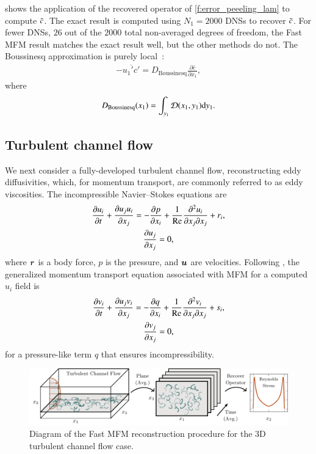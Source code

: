 \documentclass[11pt,sort&compress]{elsarticle}
\begin{document}
 shows the application of the recovered operator of \cref{f:error_peeeling_lam} to compute $\bar{c}$. 
The exact result is computed using $N_1 = 2000$ DNSs to recover $\bar{c}$.
For fewer DNSs, $26$ out of the $2000$ total non-averaged degrees of freedom, the Fast MFM result matches the exact result well, but the other methods do not. 
The Boussinesq approximation is purely local~\citep{hamba2004nonlocal}:
\begin{gather}
    -\overline{u_1'c'} = D_{\mathrm{Boussinesq}}\frac{\partial \bar{c}}{\partial x_1},
\end{gather}
where
\begin{gather}
    D_{\mathrm{Boussinesq}}(x_1) = 
    \int_{y_1} \mathcal{D}(x_1,y_1) \text{d} y_1.
\end{gather}

\subsection{Turbulent channel flow}

We next consider a fully-developed turbulent channel flow, reconstructing eddy diffusivities, which, for momentum transport, are commonly referred to as eddy viscosities.
The incompressible Navier--Stokes equations are
\begin{gather}
    \frac{ \partial u_i}{\partial t} + 
    \frac{\partial u_j u_i}{\partial x_j} = 
    -\frac{\partial p}{\partial x_i} + 
    \frac{1}{\mbox{\text{Re}}} \frac{\partial^2 u_i}{\partial x_j \partial x_j} + r_i, \\
    \frac{\partial u_j}{\partial x_j} = 0,
\end{gather}
where $\bm{r}$ is a body force, $p$ is the pressure, and $\bm{u}$ are velocities.
Following \citet{maniMacroscopicForcingMethod2021}, the generalized momentum transport equation associated with MFM for a computed $u_i$ field is
\begin{gather}
    \frac{ \partial v_i}{\partial t} + 
    \frac{\partial u_j v_i}{\partial x_j} = 
    -\frac{\partial q}{\partial x_i} + 
    \frac{1}{\mbox{\text{Re}}} \frac{\partial^2 v_i}{\partial x_j \partial x_j} + s_i, \\
    \frac{\partial v_j}{\partial x_j} = 0,
\end{gather}
for a pressure-like term $q$ that ensures incompressibility. 

\begin{figure}
    \centering
    \includegraphics[scale=1]{figures/3d-channel.pdf}
    \caption{
        Diagram of the Fast MFM reconstruction procedure for the 3D turbulent channel flow case.
    }
    \label{f:schematic-turb}
\end{figure}
\end{document}
